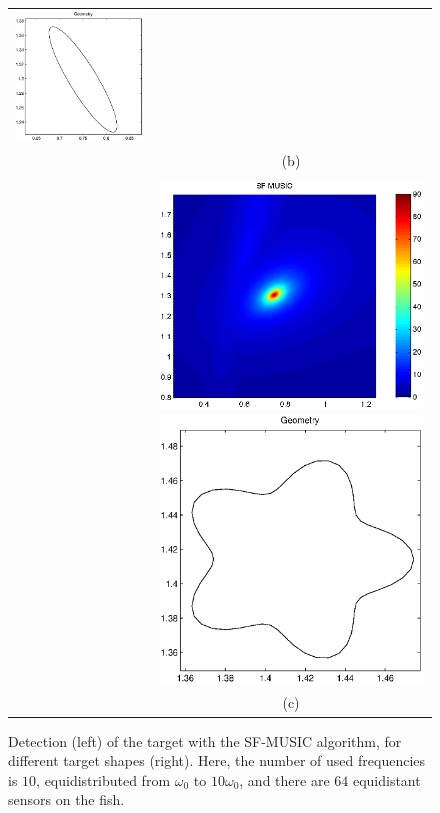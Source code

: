 \begin{figure}[!h]
\begin{tabular}{lc}
\hspace{0.5cm} \includegraphics[width=7cm]{model/ellipse_geometry.eps} \\
& (b)\\ \tabularnewline  &
\includegraphics[width=7cm]{model/star.eps}
 \hspace{0.5cm} \includegraphics[width=7cm]{model/star_geometry.eps}\\
 & (c) \\
\end{tabular}
\caption{\label{fig:SF-MUSIC}Detection (left) of the target with
the SF-MUSIC algorithm, for different target shapes (right). Here,
the number of used frequencies is $10$, equidistributed from
$\omega_0$ to $10 \omega_0$, and there are $64$ equidistant
sensors on the fish.}
\end{figure}

